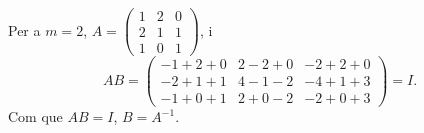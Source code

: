 \begin{apartats}
\begin{nomesllarg}
\begin{solucio}
Per a $m=2$, $A=\begin{pmatrix}1&2&0\\2&1&1\\1&0&1\end{pmatrix}$, i
\[
AB=\begin{pmatrix}-1+2+0&2-2+0&-2+2+0\\-2+1+1&4-1-2&-4+1+3\\-1+0+1&2+0-2&-2+0+3\end{pmatrix}=I.
\]
Com que $AB=I$, $B=A^{-1}$.
\end{solucio}
\end{nomesllarg}

\end{apartats}
